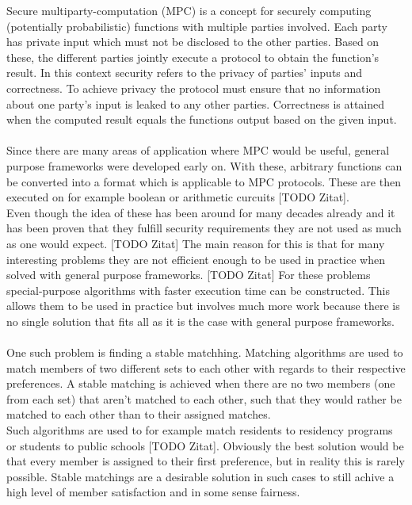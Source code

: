 Secure multiparty-computation (MPC) is a concept for securely computing (potentially probabilistic) functions with multiple parties involved. Each party has private input which must not be disclosed to the other parties. Based on these, the different parties jointly execute a protocol to obtain the function's result.
In this context security refers to the privacy of parties' inputs and correctness. To achieve privacy the protocol must ensure that no information about one party's input is leaked to any other parties. Correctness is attained when the computed result equals the functions output based on the given input.\\
\ \\Since there are many areas of application where MPC would be useful, general purpose frameworks were developed early on. With these, arbitrary functions can be converted into a format which is applicable to MPC protocols. These are then executed on for example boolean or arithmetic curcuits [TODO Zitat].\\ 
Even though the idea of these has been around for many decades already and it has been proven that they fulfill security requirements they are not used as much as one would expect. [TODO Zitat] The main reason for this is that for many interesting problems they are not efficient enough to be used in practice when solved with general purpose frameworks. [TODO Zitat] For these problems special-purpose algorithms with faster execution time can be constructed. This allows them to be used in practice but involves much more work because there is no single solution that fits all as it is the case with general purpose frameworks. \\
\ \\One such problem is finding a stable matchhing. Matching algorithms are used to match members of two different sets to each other with regards to their respective preferences. A stable matching is achieved when there are no two members (one from each set) that aren't matched to each other, such that they would rather be matched to each other than to their assigned matches.\\ 
Such algorithms are used to for example match residents to residency programs or students to public schools [TODO Zitat]. Obviously the best solution would be that every member is assigned to their first preference, but in reality this is rarely possible. Stable matchings are a desirable solution in such cases to still achive a high level of member satisfaction and in some sense fairness.\\
